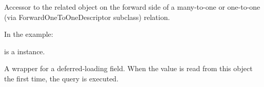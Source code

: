 \documentclass[letterpaper,10pt,english]{sphinxmanual}
\begin{document}
\begin{fulllineitems}
\begin{fulllineitems}
\end{fulllineitems}


\begin{fulllineitems}
\label{\detokenize{modules/models:gestion.models.HistoricalKeg.galopin}}
Accessor to the related object on the forward side of a many-to-one or
one-to-one (via ForwardOneToOneDescriptor subclass) relation.

In the example:

\begin{sphinxVerbatim}[commandchars=\\\{\}]
 
       
\end{sphinxVerbatim}

 is a  instance.

\end{fulllineitems}


\begin{fulllineitems}
\label{\detokenize{modules/models:gestion.models.HistoricalKeg.galopin_id}}
A wrapper for a deferred-loading field. When the value is read from this
object the first time, the query is executed.

\end{fulllineitems}


\begin{fulllineitems}
\label{\detokenize{modules/models:gestion.models.HistoricalKeg.get_history_type_display}}
\end{fulllineitems}


\end{fulllineitems}
\end{document}
